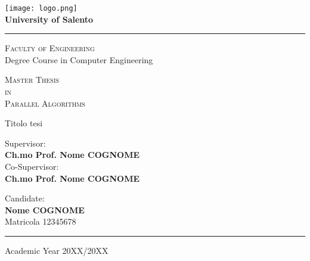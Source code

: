 

\linespread{1.5}

\begin{titlepage}
 
\begin{center}
 
\texttt{[image: logo.png]}
\\
\vspace{.3cm}
\textbf{\Large University of Salento}
\vspace{.2cm}
\hrule

\begin{center}
	\doublespacing
	\textsc{\Large Faculty of Engineering} \\

	\textmd{\Large Degree Course in Computer Engineering}
	
	\vspace{1cm} 
	\textsc{\Large Master Thesis} \\
	\textsc{\Large in} \\
	\textsc{\Large Parallel Algorithms}	
	\vspace{2.3cm}
	
	\Huge \doublespacing \bfseries \begin{spacing}{1}{Titolo tesi}\end{spacing}
\end{center}
 
\hfill
\vspace{2.5cm}

\begin{flushleft}
	\begin{minipage}[c]{.55\textwidth}
		\singlespacing
		\fontsize{12}{12} \textmd{Supervisor:} \\
		\fontsize{14.4}{12} \textbf{Ch.mo Prof. Nome COGNOME} \\
		\fontsize{12}{12} \textmd{Co-Supervisor:} \\
		\fontsize{14.4}{12} \textbf{Ch.mo Prof. Nome COGNOME}
	\end{minipage}%
	\hspace{10mm}%
	\begin{minipage}[c]{.35\textwidth}
		\bigskip
		\bigskip
		\singlespacing
		\fontsize{12}{12} \textmd{Candidate:} \\
		\fontsize{14.4}{12} \textbf{Nome COGNOME} \\
		\fontsize{12}{12} \textmd{Matricola 12345678} \\
	\end{minipage}
\end{flushleft}

\vfill
\hfill

\vspace{.25cm}
\hrule
\vspace{.25cm}
{\small Academic Year 20XX/20XX} 
\end{center}
\clearpage
\end{titlepage}

\restoregeometry
